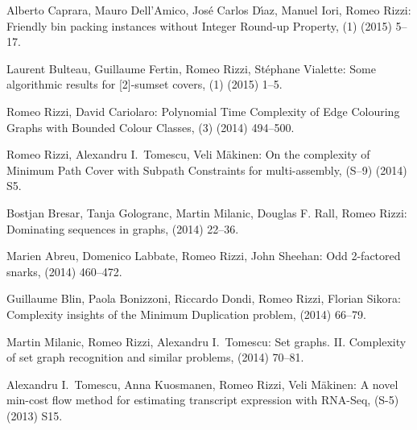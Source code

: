 \begin{etaremune}
  \item {\sc Alberto Caprara, Mauro Dell'Amico, Jos\'e Carlos D\'\i{}az, Manuel Iori, Romeo Rizzi:}
   \newblock Friendly bin packing instances without Integer Round-up Property,
   (1) (2015) 5--17.

  \item {\sc Laurent Bulteau, Guillaume Fertin, Romeo Rizzi, St\'ephane Vialette:}
   \newblock  Some algorithmic results for [2]-sumset covers,
   (1) (2015) 1--5.

  \item {\sc Romeo Rizzi, David Cariolaro:}
   \newblock  Polynomial Time Complexity of Edge Colouring Graphs with Bounded Colour Classes,
   (3) (2014) 494--500.

  \item {\sc Romeo Rizzi, Alexandru I.~Tomescu, Veli M\"akinen:}
   \newblock  On the complexity of Minimum Path Cover with Subpath Constraints for multi-assembly,
   (S--9) (2014) S5.

  \item {\sc Bostjan Bresar, Tanja Gologranc, Martin Milanic, Douglas F. Rall, Romeo Rizzi:}
   \newblock  Dominating sequences in graphs,
    (2014) 22--36.

  \item {\sc Marien Abreu, Domenico Labbate, Romeo Rizzi, John Sheehan:}
   \newblock  Odd 2-factored snarks,
    (2014) 460--472.

  \item {\sc Guillaume Blin, Paola Bonizzoni, Riccardo Dondi, Romeo Rizzi, Florian Sikora:}
   \newblock  Complexity insights of the Minimum Duplication problem,
    (2014) 66--79.

  \item {\sc Martin Milanic, Romeo Rizzi, Alexandru I.~Tomescu:}
   \newblock  Set graphs. II. Complexity of set graph recognition and similar problems,
    (2014) 70--81. 

  \item {\sc Alexandru I.~Tomescu, Anna Kuosmanen, Romeo Rizzi, Veli M\"akinen:}
   \newblock  A novel min-cost flow method for estimating transcript expression with RNA-Seq,
   (S-5) (2013) S15. 


\end{etaremune}

